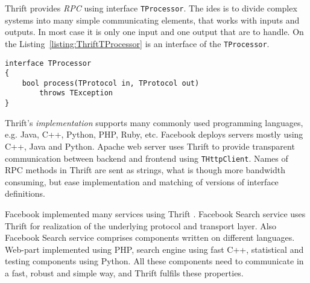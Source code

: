 Thrift provides \textit{RPC}  using interface \lstinline{TProcessor}.
The ides is to divide complex systems into many simple communicating elements, that works with inputs and outputs.
In most case it is only one input and one output that are to handle.
On the Listing~\ref{listing:ThriftTProcessor} is an interface of the \lstinline{TProcessor}.

\begin{lstlisting}[float=h, caption=Thrift's TProcessor interface., label=listing:ThriftTProcessor]
interface TProcessor
{
	bool process(TProtocol in, TProtocol out)
		throws TException
}
\end{lstlisting}


Thrift's \textit{implementation}  supports many commonly used programming languages, e.g. Java, C++, Python, PHP, Ruby, etc.
Facebook deploys servers mostly using C++, Java and Python.
Apache web server uses Thrift to provide transparent communication between backend and frontend using \lstinline{THttpClient}.
Names of RPC methods in Thrift are sent as strings, what is though more bandwidth consuming, but ease implementation and matching of versions of interface definitions.


Facebook implemented many services using Thrift .
Facebook Search service uses Thrift for realization of the underlying protocol and transport layer.
Also Facebook Search service comprises components written on different languages.
Web-part implemented using PHP, search engine using fast C++, statistical and testing components using Python.
All these components need to communicate in a fast, robust and simple way, and Thrift fulfils these properties.